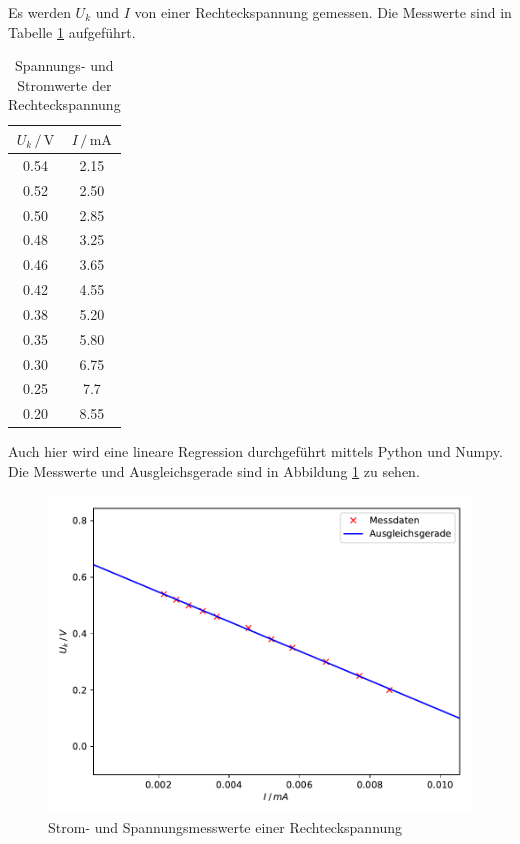 Es werden $U_k$ und $I$ von einer Rechteckspannung gemessen. Die Messwerte
sind in Tabelle \ref{tab:Rechteck} aufgeführt.

\begin{table}
   \centering
   \caption{Spannungs- und Stromwerte der Rechteckspannung}
   \label{tab:Rechteck}
   \begin{tabular}{c c}
      \toprule
       $U_k \,/\, \si{\volt}$ & $I \,/\, \si{\milli\ampere}$\\
      \midrule
        0.54 & 2.15\\
        0.52 & 2.50\\
        0.50 & 2.85\\
        0.48 & 3.25\\ 
        0.46 & 3.65\\
        0.42 & 4.55\\
        0.38 & 5.20\\
        0.35 & 5.80\\
        0.30 & 6.75\\
        0.25 & 7.7\\
        0.20 & 8.55\\
      \bottomrule
   \end{tabular}
\end{table}

Auch hier wird eine lineare Regression durchgeführt mittels Python 
und Numpy. Die Messwerte und Ausgleichsgerade sind in Abbildung \ref{fig:plot3}
zu sehen.

\begin{figure}
  \centering
  \includegraphics[scale=0.75]{content/plot3.pdf}
  \caption{Strom- und Spannungsmesswerte einer Rechteckspannung}
  \label{fig:plot3}
\end{figure}

